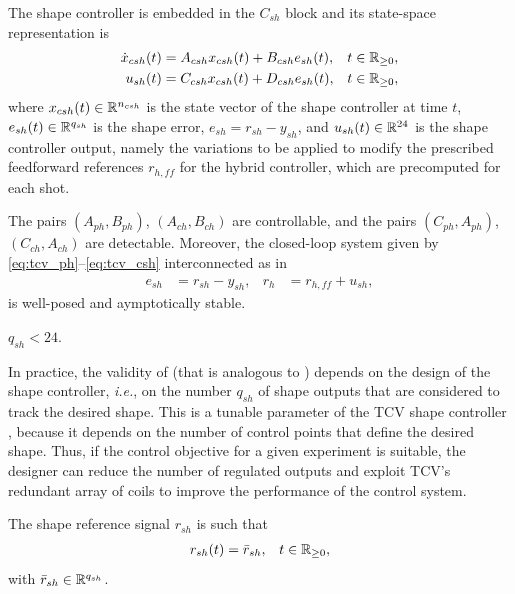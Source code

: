 The shape controller is embedded in the $C_{sh}$ block and its state-space representation is
\begin{subequations}
  \label{eq:tcv_csh}
  \begin{align}
    \dot{x}_{csh}(t) &= A_{csh}x_{csh}(t) + B_{csh}e_{sh}(t), & t\in\mathbb{R}_{\geq 0},\\
    u_{sh}(t) &= C_{csh}x_{csh}(t) + D_{csh}e_{sh}(t), & t\in\mathbb{R}_{\geq 0},
  \end{align}
\end{subequations}
where $x_{csh}(t)\in\mathbb{R}^{n_{csh}}$ is the state vector of the shape controller at time $t$, $e_{sh}(t)\in\mathbb{R}^{q_{sh}}$ is the shape error, $e_{sh} = r_{sh} - y_{sh}$, and $u_{sh}(t)\in\mathbb{R}^{24}$ is the shape controller output, namely the variations to be applied to modify the prescribed feedforward references $r_{h,ff}$ for the hybrid controller, which are precomputed for each shot.

\begin{assumption}
  \label{ass:tcvstab}
  The pairs $(A_{ph},B_{ph})$, $(A_{ch},B_{ch})$ are controllable, and the pairs $(C_{ph},A_{ph})$, $(C_{ch},A_{ch})$ are detectable. Moreover, the closed-loop system given by \eqref{eq:tcv_ph}--\eqref{eq:tcv_csh} interconnected as in
  \begin{align}
    \label{eq:tcv_interconn}
    e_{sh} &= r_{sh} - y_{sh}, & r_h &= r_{h,ff} + u_{sh},
  \end{align}
  is well-posed and aymptotically stable.\closestatement
\end{assumption}

\begin{assumption}
  \label{ass:tcvoveract}
  $q_{sh} < 24$.\closestatement
\end{assumption}

In practice, the validity of  (that is analogous to ) depends on the design of the shape controller, \emph{i.e.}, on the number $q_{sh}$ of shape outputs that are considered to track the desired shape. This is a tunable parameter of the TCV shape controller \cite{mele_design_2024}, because it depends on the number of control points that define the desired shape. Thus, if the control objective for a given experiment is suitable, the designer can reduce the number of regulated outputs and exploit TCV's redundant array of coils to improve the performance of the control system.

\begin{assumption}
  \label{ass:tcvrefs}
  The shape reference signal $r_{sh}$ is such that
  \begin{align}
    \label{eq:tcvrefs}
    r_{sh}(t) &= \bar{r}_{sh}, & t\in\mathbb{R}_{\geq 0},
  \end{align}
  with $\bar{r}_{sh}\in\mathbb{R}^{q_{sh}}$.\closestatement
\end{assumption}

